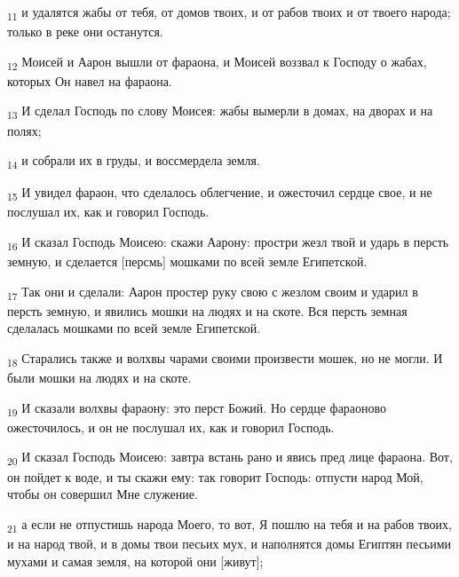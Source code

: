 \begin{tcolorbox}
\textsubscript{11} и удалятся жабы от тебя, от домов твоих, и от рабов твоих и от твоего народа; только в реке они останутся.
\end{tcolorbox}
\begin{tcolorbox}
\textsubscript{12} Моисей и Аарон вышли от фараона, и Моисей воззвал к Господу о жабах, которых Он навел на фараона.
\end{tcolorbox}
\begin{tcolorbox}
\textsubscript{13} И сделал Господь по слову Моисея: жабы вымерли в домах, на дворах и на полях;
\end{tcolorbox}
\begin{tcolorbox}
\textsubscript{14} и собрали их в груды, и воссмердела земля.
\end{tcolorbox}
\begin{tcolorbox}
\textsubscript{15} И увидел фараон, что сделалось облегчение, и ожесточил сердце свое, и не послушал их, как и говорил Господь.
\end{tcolorbox}
\begin{tcolorbox}
\textsubscript{16} И сказал Господь Моисею: скажи Аарону: простри жезл твой и ударь в персть земную, и сделается [персмь] мошками по всей земле Египетской.
\end{tcolorbox}
\begin{tcolorbox}
\textsubscript{17} Так они и сделали: Аарон простер руку свою с жезлом своим и ударил в персть земную, и явились мошки на людях и на скоте. Вся персть земная сделалась мошками по всей земле Египетской.
\end{tcolorbox}
\begin{tcolorbox}
\textsubscript{18} Старались также и волхвы чарами своими произвести мошек, но не могли. И были мошки на людях и на скоте.
\end{tcolorbox}
\begin{tcolorbox}
\textsubscript{19} И сказали волхвы фараону: это перст Божий. Но сердце фараоново ожесточилось, и он не послушал их, как и говорил Господь.
\end{tcolorbox}
\begin{tcolorbox}
\textsubscript{20} И сказал Господь Моисею: завтра встань рано и явись пред лице фараона. Вот, он пойдет к воде, и ты скажи ему: так говорит Господь: отпусти народ Мой, чтобы он совершил Мне служение.
\end{tcolorbox}
\begin{tcolorbox}
\textsubscript{21} а если не отпустишь народа Моего, то вот, Я пошлю на тебя и на рабов твоих, и на народ твой, и в домы твои песьих мух, и наполнятся домы Египтян песьими мухами и самая земля, на которой они [живут];
\end{tcolorbox}
